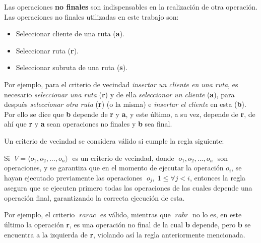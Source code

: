 \documentclass[a4paper,10pt,twocolumn]{article}
\begin{document}
	Las operaciones \textbf{no finales} son indispensables en la realización de otra
	operación. Las operaciones no finales utilizadas en este trabajo son:
	
	\begin{itemize}
		\item Seleccionar cliente de una ruta (\textbf{a}).
		\item Seleccionar ruta (\textbf{r}).
		\item Seleccionar subruta de una ruta (\textbf{s}).
	\end{itemize}

	Por ejemplo, para el criterio de vecindad \textit{insertar un cliente en una ruta},
	es necesario \textit{seleccionar una ruta} (\textbf{r}) y de ella \textit{seleccionar 
	un cliente} (\textbf{a}), para después \textit{seleccionar otra ruta} (\textbf{r}) 
	(o la misma) e \textit{insertar el cliente} en esta (\textbf{b}). Por ello se dice que 
	\textbf{b} depende de \textbf{r} y \textbf{a}, y este último, a su vez, depende de 
	\textbf{r}, de ahí que \textbf{r} y \textbf{a} sean operaciones no finales y \textbf{b} 
	sea final.
	
	Un criterio de vecindad se considera válido si cumple la regla siguiente:
	
	\begin{center}
	\end{center}
	
	Si $\; V = \langle o_1, o_2, ..., o_n \rangle \;$ es un criterio de vecindad, donde
	$\; o_1, o_2, ..., o_n \;$ son operaciones, y se garantiza que en el momento de 
	ejecutar la operación $ o_i $, se hayan ejecutado previamente las operaciones 
	$\; o_j,\; 1 \leq \forall j < i $, entonces la regla asegura que se ejecuten 
	primero todas las operaciones de las cuales depende una operación final, 
	garantizando la correcta ejecución de esta.

	Por ejemplo, el criterio $\;rarac\;$ es válido, mientras que $\;rabr\;$ no lo es, 
	en este último la operación \textbf{r}, es una operación no final de la cual \textbf{b} 
	depende, pero \textbf{b} se encuentra a la izquierda de \textbf{r}, violando así la 
	regla anteriormente mencionada.
\end{document}
